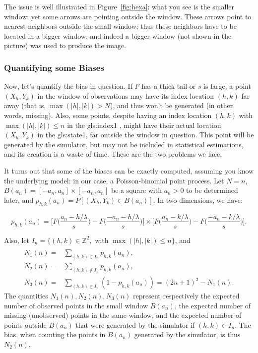 \documentclass[10pt]{article}
\begin{document}
The issue is well illustrated in Figure~\ref{fig:hexa}: what you see is the smaller window; yet some arrows are pointing outside the window. These arrows point to nearest neighbors outside the small window; thus these neighbors have to be located in a bigger window, and indeed a bigger window (not shown in the picture) was used to produce the image.

\subsubsection{Quantifying some Biases}

Now, let's quantify the bias in question. If $F$ has a thick tail or $s$ is large, a point $(X_h,Y_k)$ in the window of observations may have its index location $(h,k)$ far away (that is, $\max(|h|,|k|)>N$), and thus won't be generated (in other words, missing). Also, some points, despite having an index location 
$(h,k)$ with  $\max(|h|,|k|)\leq n$ in the \gls{gls:index1} , might have their actual location $(X_h,Y_k)$ in the \gls{gls:state1}, far outside the window in question. This point will be generated by the simulator, but may not be included in statistical estimations, and its creation is a waste of time. These are the two problems we face.

It turns out that some of the biases can be exactly computed, assuming you know the underlying model: in our case, a Poisson-binomial point process. Let $N=n$, 
$B(a_n)=[-a_n,a_n]\times [-a_n,a_n]$ be a square with $a_n>0$ to be determined later, and $p_{h,k}(a_n)=P[(X_h,Y_k)\in B(a_n)]$. In two dimensions, we have:

$$p_{h,k}(a_n)=\Big[F\Big(\frac{a_n-h/\lambda}{s}\Big)-F\Big(\frac{-a_n-h/\lambda}{s}\Big) \Big]\times 
\Big[F\Big(\frac{a_n-k/\lambda}{s}\Big)-F\Big(\frac{-a_n-k/\lambda}{s}\Big)\Big].$$

\noindent Also, let $I_n=  \{(h,k)\in \mathbb{Z}^2, \mbox{ with } \max(|h|,|k|)\leq n \}$, and 
\begin{align}
 \nonumber \\
N_1(n)= &\sum_{(h,k)\in I_n} p_{h,k}(a_n),\nonumber \\
N_2(n)= &\sum_{(h,k)\notin I_n} p_{h,k}(a_n),\nonumber \\
N_3(n)=&\sum_{(h,k) \in I_n} (1-p_{h,k}(a_n)) = (2n+1)^2-N_1(n). \nonumber 
\end{align}
The quantities $N_1(n),N_2(n),N_3(n)$ represent respectively the expected number of observed points in the small window $B(a_n)$, the expected number of missing (unobserved) points in the same window, and the expected number of points outside $B(a_n)$ that were generated by the simulator if $(h,k)\in I_n$. The bias, when counting the points in $B(a_n)$ generated by the simulator, is thus  $N_2(n)$. 
\end{document}
